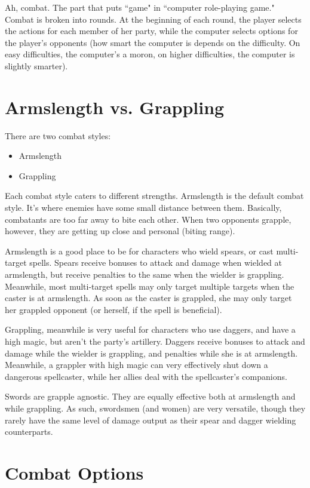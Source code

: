 \documentclass{report}
\begin{document}
Ah, combat. The part that puts ``game" in ``computer role-playing game." Combat
is broken into rounds. At the beginning of each round, the player selects the 
actions for each member of her party, while the computer selects options for the
player's opponents (how smart the computer is depends on the difficulty. On easy
difficulties, the computer's a moron, on higher difficulties, the computer is
slightly smarter).

\section{Armslength vs. Grappling}

There are two combat styles:
\begin{itemize}
    \item Armslength
    \item Grappling
\end{itemize}

Each combat style caters to different strengths. Armslength is the default combat
style. It's where enemies have some small distance between them. Basically, combatants are too far
away to bite each other. When two opponents grapple, however, they are getting
up close and personal (biting range).

Armslength is a good place to be for characters who wield spears, or cast 
multi-target spells. Spears receive bonuses to attack and damage when wielded at
armslength, but receive penalties to the same when the wielder is grappling. 
Meanwhile, most multi-target spells may only target multiple targets when the 
caster is at armslength. As soon as the caster is grappled, she may only target
her grappled opponent (or herself, if the spell is beneficial).

Grappling, meanwhile is very useful for characters who use daggers, and have a 
high magic, but aren't the party's artillery. Daggers receive bonuses to attack
and damage while the wielder is grappling, and penalties while she is at
armslength. Meanwhile, a grappler with high magic can very effectively shut down
a dangerous spellcaster, while her allies deal with the spellcaster's companions.

Swords are grapple agnostic. They are equally effective both at armslength and
while grappling. As such, swordsmen (and women) are very versatile, though they rarely have the 
same level of damage output as their spear and dagger wielding counterparts.

\section{Combat Options}
\end{document}
